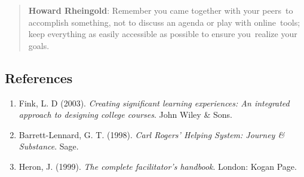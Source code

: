 \begin{quote}
\textbf{Howard Rheingold}: Remember you came together with your peers~to
accomplish something, not to discuss an agenda or play with
online~tools; keep everything as easily accessible as possible to ensure
you~realize your goals.
\end{quote}

\subsection{References}\label{references}

\begin{enumerate}
\def\labelenumi{\arabic{enumi}.}
\item
  Fink, L. D (2003). \emph{Creating significant learning experiences: An
  integrated approach to designing college courses}. John Wiley \& Sons.
\item
  Barrett-Lennard, G. T. (1998). \emph{Carl Rogers' Helping System:
  Journey \& Substance}. Sage.
\item
  Heron, J. (1999). \emph{The complete facilitator's handbook}. London:
  Kogan Page.
\end{enumerate}

~
